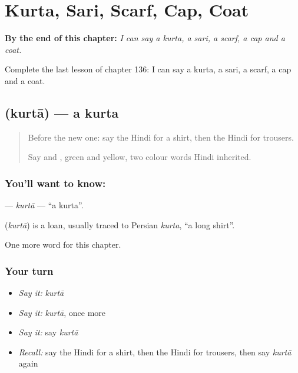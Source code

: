
\chapter{Kurta, Sari, Scarf, Cap, Coat}
\label{ch:hi-kurta-sari-scarf-cap-coat}

\begin{chapteropening}
\textbf{By the end of this chapter:} \emph{I can say a kurta, a sari, a scarf, a cap and a coat.}

Complete the last lesson of chapter 136: I can say a kurta, a sari, a scarf, a cap and a coat.
\end{chapteropening}

\section[\texorpdfstring{\hi{कुर्ता} (kurtā)}{कुर्ता (kurtā)}]{ (kurtā) — a kurta}

\label{lesson:HI-C136-kurta}



\begin{quote}
Before the new one: say the Hindi for a shirt, then the Hindi for trousers.

Say \textbf{} and \textbf{}, green and yellow, two colour words Hindi inherited.
\end{quote}

\subsection*{You'll want to know: }
\textbf{} — \emph{kurtā} — \textquotedblleft{}a kurta\textquotedblright{}.

\begin{cousinweb}
\textbf{} (\emph{kurtā}) is a loan, usually traced to Persian \emph{kurta}, \textquotedblleft{}a long shirt\textquotedblright{}.
\end{cousinweb}

\begin{grammarlens}[title={What you've built}]
One more word for this chapter.
\end{grammarlens}

\subsection*{Your turn}
\begin{itemize}
\raggedright
  \item \emph{Say it:} \emph{kurtā}
  \item \emph{Say it:} \emph{kurtā}, once more
  \item \emph{Say it:} say \emph{kurtā}
  \item \emph{Recall:} say the Hindi for a shirt, then the Hindi for trousers, then say \emph{kurtā} again
\end{itemize}

